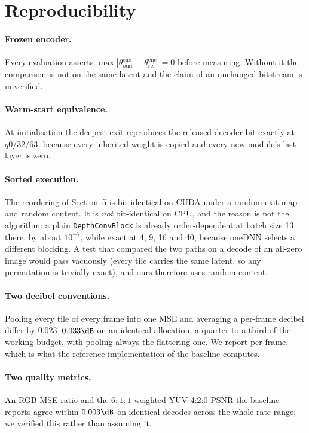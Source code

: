 \section{Reproducibility}

\paragraph{Frozen encoder.} Every evaluation asserts
$\max|\theta^{\mathrm{enc}}_{\mathrm{ours}} - \theta^{\mathrm{enc}}_{\mathrm{rel}}| = 0$
before measuring. Without it the comparison is not on the same latent and the
claim of an unchanged bitstream is unverified.

\paragraph{Warm-start equivalence.} At initialisation the deepest exit
reproduces the released decoder bit-exactly at $q0/32/63$, because every
inherited weight is copied and every new module's last layer is zero.

\paragraph{Sorted execution.} The reordering of
Section~5 is bit-identical on CUDA under a random exit map and random content.
It is \emph{not} bit-identical on CPU, and the reason is not the algorithm: a
plain \texttt{DepthConvBlock} is already order-dependent at batch size 13 there,
by about $10^{-7}$, while exact at 4, 9, 16 and 40, because oneDNN selects a
different blocking. A test that compared the two paths on a decode of an
all-zero image would pass vacuously (every tile carries the same latent, so any
permutation is trivially exact), and ours therefore uses random content.

\paragraph{Two decibel conventions.} Pooling every tile of every frame into one
MSE and averaging a per-frame decibel differ by $0.023$--$0.033\dB$ on an
identical allocation, a quarter to a third of the working budget, with pooling
always the flattering one. We report per-frame, which is what the reference
implementation of the baseline computes.

\paragraph{Two quality metrics.} An RGB MSE ratio and the $6{:}1{:}1$-weighted
YUV 4:2:0 PSNR the baseline reports agree within $0.003\dB$ on identical
decodes across the whole rate range; we verified this rather than assuming it.

